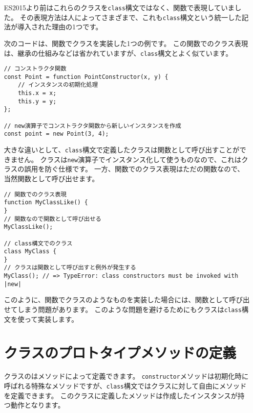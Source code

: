 \begin{tcolorbox}[enhanced jigsaw,breakable,title=\texttt{class}構文と関数でのクラスの違い]\label{class-vs-function}

ES2015より前はこれらのクラスを\texttt{class}構文ではなく、関数で表現していました。
その表現方法は人によってさまざまで、これも\texttt{class}構文という統一した記法が導入された理由の1つです。

次のコードは、関数でクラスを実装した1つの例です。
この関数でのクラス表現は、継承の仕組みなどは省かれていますが、\texttt{class}構文とよく似ています。

\begin{lstlisting}
// コンストラクタ関数
const Point = function PointConstructor(x, y) {
    // インスタンスの初期化処理
    this.x = x;
    this.y = y;
};

// new演算子でコンストラクタ関数から新しいインスタンスを作成
const point = new Point(3, 4);
\end{lstlisting}

大きな違いとして、\texttt{class}構文で定義したクラスは関数として呼び出すことができません。
クラスは\texttt{new}演算子でインスタンス化して使うものなので、これはクラスの誤用を防ぐ仕様です。
一方、関数でのクラス表現はただの関数なので、当然関数として呼び出せます。

\begin{lstlisting}
// 関数でのクラス表現
function MyClassLike() {
}
// 関数なので関数として呼び出せる
MyClassLike(); 

// class構文でのクラス
class MyClass {
}
// クラスは関数として呼び出すと例外が発生する
MyClass(); // => TypeError: class constructors must be invoked with |new|
\end{lstlisting}

このように、関数でクラスのようなものを実装した場合には、関数として呼び出せてしまう問題があります。
このような問題を避けるためにもクラスは\texttt{class}構文を使って実装します。
\end{tcolorbox}
\newpage
\hypertarget{class-prototype-method-definition}{%
\section{クラスのプロトタイプメソッドの定義}\label{class-prototype-method-definition}}

クラスの\textbf{}はメソッドによって定義できます。
\texttt{constructor}メソッドは初期化時に呼ばれる特殊なメソッドですが、\texttt{class}構文ではクラスに対して自由にメソッドを定義できます。
このクラスに定義したメソッドは作成したインスタンスが持つ動作となります。

